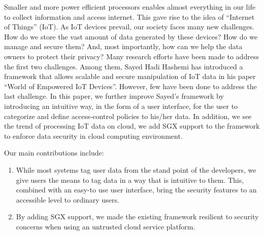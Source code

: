 Smaller and more power efficient processors enables almost everything in our life to collect information and access internet. This gave rise to the idea of “Internet of Things” (IoT). 
As IoT devices prevail, our society faces many new challenges. How do we store the vast amount of data generated by these devices? How do we manage and secure them? And, most importantly, how can we help the data owners to protect their privacy? Many research efforts have been made to address the first two challenges. Among them, Sayed Hadi Hashemi has introduced a framework that allows scalable and secure manipulation of IoT data in his paper “World of Empowered IoT Devices”. However, few have been done to address the last challenge. In this paper, we further improve Sayed’s framework by introducing an intuitive way, in the form of a user interface, for the user to categorize and define access-control policies to his/her data. In addition, we see the trend of processing IoT data on cloud, we add SGX support to the framework to enforce data security in cloud computing environment.

Our main contributions include:
\begin{enumerate}
	\item While most systems tag user data from the stand point of the developers, we give users the means to tag data in a way that is intuitive to them. This, combined with an easy-to use user interface, bring the security features to an accessible level to ordinary users.

	\item By adding SGX support, we made the existing framework resilient to security concerns when using an untrusted cloud service platform.
\end{enumerate}
